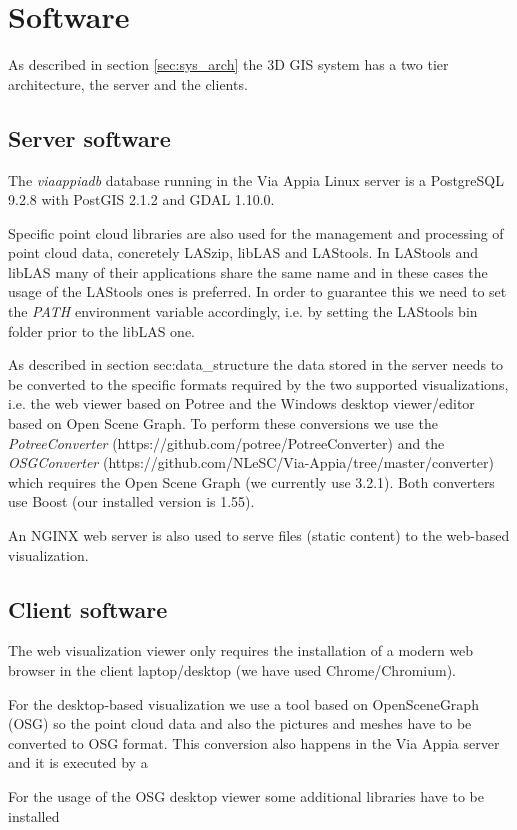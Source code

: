 \section{Software}

As described in section \ref{sec:sys_arch} the 3D GIS system has a two tier architecture, the server and the clients. 

\subsection{Server software}

The \textit{viaappiadb} database running in the Via Appia Linux server is a PostgreSQL 9.2.8 with PostGIS 2.1.2 and GDAL 1.10.0.

Specific point cloud libraries are also used for the management and processing of point cloud data, concretely LASzip, libLAS and LAStools. In LAStools and libLAS many of their applications share the same name and in these cases the usage of the LAStools ones is preferred. In order to guarantee this we need to set the \textit{PATH} environment variable accordingly, i.e. by setting the LAStools bin folder prior to the libLAS one.

As described in section {sec:data_structure} the data stored in the server needs to be converted to the specific formats required by the two supported visualizations, i.e. the web viewer based on Potree and the Windows desktop viewer/editor based on Open Scene Graph. To perform these conversions we use the \textit{PotreeConverter} (https://github.com/potree/PotreeConverter) and the \textit{OSGConverter} (https://github.com/NLeSC/Via-Appia/tree/master/converter) which requires the Open Scene Graph (we currently use 3.2.1). Both converters use Boost (our installed version is 1.55).

An NGINX web server is also used to serve files (static content) to the web-based visualization. 

\subsection{Client software}

The web visualization viewer only requires the installation of a modern web browser in the client laptop/desktop (we have used Chrome/Chromium).

For the desktop-based visualization we use a tool based on OpenSceneGraph (OSG) so the point cloud data and also the pictures and meshes have to be converted to OSG format. This conversion also happens in the Via Appia server and it is executed by a

For the usage of the OSG desktop viewer some additional libraries have to be installed



 
